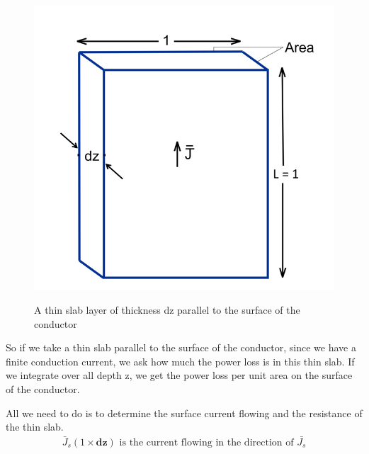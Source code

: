 \begin{figure}
\centering
\textsc{\includegraphics[scale=0.35]{./graphics/slab_parallel_to_conducting_surface}}
\caption{A thin slab layer of thickness dz parallel to the surface of the conductor }
\end{figure}
So if we take a thin slab parallel to the surface of the conductor, since we have a finite conduction current, we ask how much the power loss is in this thin slab. If we integrate over all depth z, we get the power loss per unit area on the surface of the conductor.

All we need to do is to determine the surface current flowing and the resistance of the thin slab.
\begin{align*}
\bar{J}_s(1\times\mathbf{dz})\text{ is the current flowing in the direction of } \bar{J_{s}}
\end{align*}

